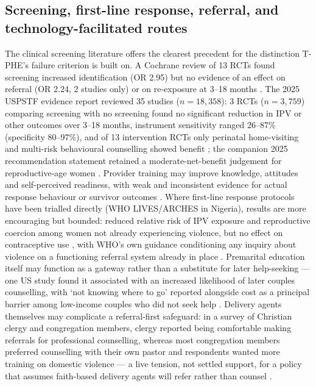 \documentclass[11pt]{article}
\newcommand{\tphe}{T\mbox{-}PHE}
\begin{document}
\subsection{Screening, first-line response, referral, and technology-facilitated routes}
The clinical screening literature offers the clearest precedent for the distinction \tphe{}'s failure criterion is built on. A Cochrane review of 13 RCTs found screening increased identification (OR 2.95) but no evidence of an effect on referral (OR 2.24, 2 studies only) or on re-exposure at 3--18 months \cite{ref38}. The 2025 USPSTF evidence report reviewed 35 studies ($n=18{,}358$): 3 RCTs ($n=3{,}759$) comparing screening with no screening found no significant reduction in IPV or other outcomes over 3--18 months, instrument sensitivity ranged 26--87\% (specificity 80--97\%), and of 13 intervention RCTs only perinatal home-visiting and multi-risk behavioural counselling showed benefit \cite{ref39}; the companion 2025 recommendation statement retained a moderate-net-benefit judgement for reproductive-age women \cite{ref40}. Provider training may improve knowledge, attitudes and self-perceived readiness, with weak and inconsistent evidence for actual response behaviour or survivor outcomes \cite{ref41}. Where first-line response protocols have been trialled directly (WHO LIVES/ARCHES in Nigeria), results are more encouraging but bounded: reduced relative risk of IPV exposure and reproductive coercion among women not already experiencing violence, but no effect on contraceptive use \cite{ref42}, with WHO's own guidance conditioning any inquiry about violence on a functioning referral system already in place \cite{ref43,ref44}. Premarital education itself may function as a gateway rather than a substitute for later help-seeking --- one US study found it associated with an increased likelihood of later couples counselling, with `not knowing where to go' reported alongside cost as a principal barrier among low-income couples who did not seek help \cite{ref106,ref107}. Delivery agents themselves may complicate a referral-first safeguard: in a survey of Christian clergy and congregation members, clergy reported being comfortable making referrals for professional counselling, whereas most congregation members preferred counselling with their own pastor and respondents wanted more training on domestic violence --- a live tension, not settled support, for a policy that assumes faith-based delivery agents will refer rather than counsel \cite{ref118}.
\end{document}
